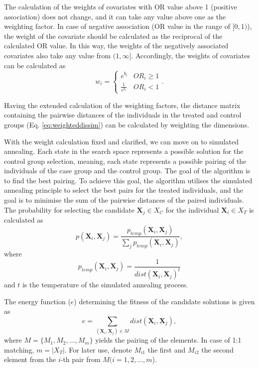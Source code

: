 		The calculation of the weights of covariates with OR value above 1 (positive association) does not change, and it can take any value above one as the weighting factor. In case of negative association (OR value in the range of $[0, 1)$), the weight of the covariate should be calculated as the reciprocal of the calculated OR value. In this way, the weights of the negatively associated covariates also take any value from $(1, \infty]$. Accordingly, the weights of covariates can be calculated as	
		\begin{equation}
			\label{eq:wimod}
			w_i = \begin{cases}
			e^{b_i} & OR_i \geq 1\\
			\frac{1}{e^{b_i}}& OR_i < 1
			\end{cases}.
		\end{equation}
						            
		Having the extended calculation of the weighting factors, the distance matrix  containing the pairwise distances of the individuals in the treated and control groups (Eq. \ref{eq:weighteddissim}) can be calculated by weighting the dimensions.
				  
		With the weight calculation fixed and clarified, we can move on to simulated annealing. Each state in the search space represents a possible solution for the control group selection, meaning, each state represents a possible pairing of the individuals of the case group and the control group. The goal of the algorithm is to find the best pairing. To achieve this goal, the algorithm utilises the simulated annealing principle to select the best pairs for the treated individuals, and the goal is to minimise the sum of the pairwise distances of the paired individuals. The probability for selecting the candidate $\textbf{X}_j \in X_C$ for the individual $\textbf{X}_i \in X_T$ is calculated as		
		\begin{equation}
			p(\textbf{X}_i,\textbf{X}_j)= \frac{p_{temp}(\textbf{X}_i,\textbf{X}_j)}{\sum_{j}p_{temp}(\textbf{X}_i,\textbf{X}_j)},
			\label{eq:probability}
		\end{equation}
		where				
		\begin{equation}
			p_{temp}(\textbf{X}_i,\textbf{X}_j)= \frac{1}{dist(\textbf{X}_i,\textbf{X}_j)^t}
			\label{eq:probabilitytemp}
		\end{equation}
		and $t$ is the temperature of the simulated annealing process.
										
		The energy function ($e$) determining the fitness of the candidate solutions is given as				
		\begin{equation}
			e=\sum_{(\textbf{X}_i, \textbf{X}_j) \in M} dist(\textbf{X}_i, \textbf{X}_j),
			\label{eq:energy}
		\end{equation}
		where $M=\{M_1, M_2, \dots, M_m\}$ yields the pairing of the elements. In case of 1:1 matching, $m=|X_T|$. For later use, denote $M_{i1}$ the first and $M_{i2}$ the second element from the $i$-th pair from $M (i=1, 2, \dots, m$).   
										
